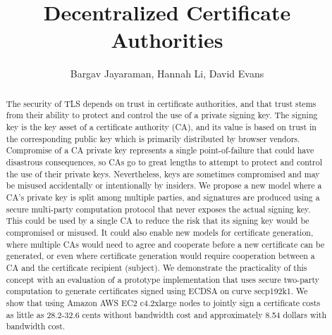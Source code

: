 \documentclass[sigconf]{acmart}
\begin{document}
\title{Decentralized Certificate Authorities}


\author{Bargav Jayaraman, Hannah Li, David Evans}

\begin{abstract}
\label{sec:abstract}
The security of TLS depends on trust in certificate authorities, and
that trust stems from their ability to protect and control the use of
a private signing key.  The signing key is the key asset of a
certificate authority (CA), and its value is based on trust in the
corresponding public key which is primarily distributed by browser
vendors.  Compromise of a CA private key represents a single
point-of-failure that could have disastrous consequences, so CAs go to
great lengths to attempt to protect and control the use of their
private keys. Nevertheless, keys are sometimes compromised and may be
misused accidentally or intentionally by insiders. We propose a new model where a CA's private key is split among
multiple parties, and signatures are produced using a secure
multi-party computation protocol that never exposes the actual signing
key. This could be used by a single CA to reduce the risk that its
signing key would be compromised or misused. It could also enable new
models for certificate generation, where multiple CAs would need to
agree and cooperate before a new certificate can be generated, or even
where certificate generation would require cooperation between a CA
and the certificate recipient (subject). We demonstrate the
practicality of this concept with an evaluation of a prototype
implementation that uses secure two-party computation to generate
certificates signed using ECDSA on curve secp192k1. We show that using
Amazon AWS EC2 c4.2xlarge nodes to jointly sign a certificate costs as
little as 28.2-32.6 cents without bandwidth cost and approximately
8.54 dollars with bandwidth cost.
 
   
\end{abstract}

%
%




\maketitle
\end{document}
